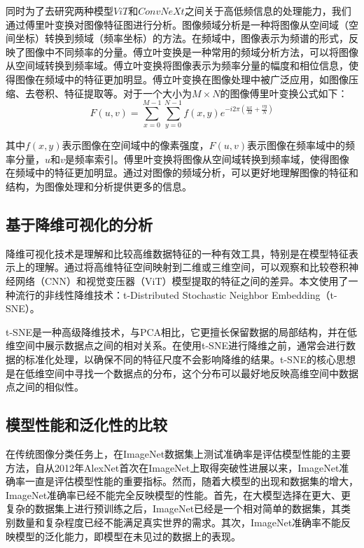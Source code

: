 同时为了去研究两种模型$ViT$和$ConvNeXt$之间关于高低频信息的处理能力，我们通过傅里叶变换对图像特征图进行分析。图像频域分析是一种将图像从空间域（空间坐标）转换到频域（频率坐标）的方法。在频域中，图像表示为频谱的形式，反映了图像中不同频率的分量。傅立叶变换是一种常用的频域分析方法，可以将图像从空间域转换到频率域。傅立叶变换将图像表示为频率分量的幅度和相位信息，使得图像在频域中的特征更加明显。傅立叶变换在图像处理中被广泛应用，如图像压缩、去卷积、特征提取等。对于一个大小为$M\times N$的图像傅里叶变换公式如下：
$$F(u, v)=\sum_{x=0}^{M-1} \sum_{y=0}^{N-1} f(x, y) e^{-i 2 \pi\left(\frac{u x}{M}+\frac{v y}{N}\right)}$$

其中$f(x,y)$表示图像在空间域中的像素强度，$F(u,v)$表示图像在频率域中的频率分量，$u$和$v$是频率索引。傅里叶变换将图像从空间域转换到频率域，使得图像在频域中的特征更加明显。通过对图像的频域分析，可以更好地理解图像的特征和结构，为图像处理和分析提供更多的信息。

\subsection{基于降维可视化的分析}

降维可视化技术是理解和比较高维数据特征的一种有效工具，特别是在模型特征表示上的理解。通过将高维特征空间映射到二维或三维空间，可以观察和比较卷积神经网络（CNN）和视觉变压器（ViT）模型提取的特征之间的差异。本文使用了一种流行的非线性降维技术：t-Distributed Stochastic Neighbor Embedding（t-SNE）。

t-SNE是一种高级降维技术，与PCA相比，它更擅长保留数据的局部结构，并在低维空间中展示数据点之间的相对关系。在使用t-SNE进行降维之前，通常会进行数据的标准化处理，以确保不同的特征尺度不会影响降维的结果。t-SNE的核心思想是在低维空间中寻找一个数据点的分布，这个分布可以最好地反映高维空间中数据点之间的相似性。

\subsection{模型性能和泛化性的比较}

在传统图像分类任务上，在ImageNet数据集上测试准确率是评估模型性能的主要方法，自从2012年AlexNet首次在ImageNet上取得突破性进展以来，ImageNet准确率一直是评估模型性能的重要指标。然而，随着大模型的出现和数据集的增大，ImageNet准确率已经不能完全反映模型的性能。首先，在大模型选择在更大、更复杂的数据集上进行预训练之后，ImageNet已经是一个相对简单的数据集，其类别数量和复杂程度已经不能满足真实世界的需求。其次，ImageNet准确率不能反映模型的泛化能力，即模型在未见过的数据上的表现。

